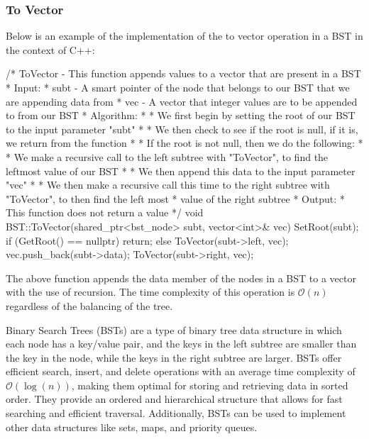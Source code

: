 \begin{highlight}

\subsubsection*{To Vector}

Below is an example of the implementation of the to vector operation in a BST in the context of C++:

\begin{code}
/*  ToVector - This function appends values to a vector that are present in a BST
*   Input:
*     subt - A smart pointer of the node that belongs to our BST that we are appending data from
*     vec - A vector that integer values are to be appended to from our BST
*   Algorithm:
*     * We first begin by setting the root of our BST to the input parameter "subt"
*     * We then check to see if the root is null, if it is, we return from the function
*     * If the root is not null, then we do the following:
*       * We make a recursive call to the left subtree with "ToVector", to find the leftmost value of our BST
*       * We then append this data to the input parameter "vec"
*       * We then make a recursive call this time to the right subtree with "ToVector", to then find the left most
*         value of the right subtree
*   Output:
*     This function does not return a value
*/
void BST::ToVector(shared_ptr<bst_node> subt, vector<int>& vec){
    SetRoot(subt);
    if (GetRoot() == nullptr) {
        return;
    }
    else {
        ToVector(subt->left, vec);
        vec.push_back(subt->data);
        ToVector(subt->right, vec);
    }
}
\end{code}

\noindent The above function appends the data member of the nodes in a BST to a vector with the use of recursion. The time complexity of this operation is $\mathcal{O}(n)$ regardless of the balancing
of the tree.
    
\end{highlight}

Binary Search Trees (BSTs) are a type of binary tree data structure in which each node has a key/value pair, and the keys in the left subtree are smaller than the key in the node, while the keys in the 
right subtree are larger. BSTs offer efficient search, insert, and delete operations with an average time complexity of $\mathcal{O}(\log{(n)})$, making them optimal for storing and retrieving data in 
sorted order. They provide an ordered and hierarchical structure that allows for fast searching and efficient traversal. Additionally, BSTs can be used to implement other data structures like sets, maps, 
and priority queues.

\clearpage